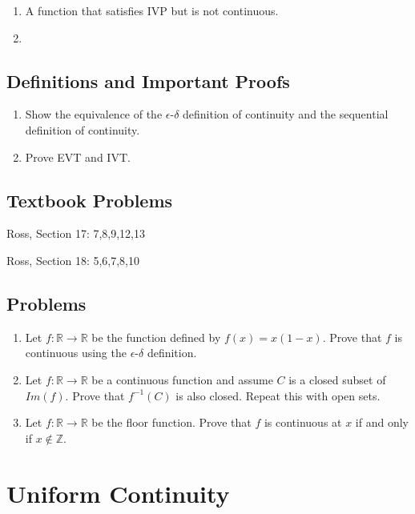 \documentclass{article}
\theoremstyle{definition}
\newcommand{\Z}{\mathbb{Z}}
\newcommand{\R}{\mathbb{R}}
\begin{document}
\begin{enumerate}
    \item A function that satisfies IVP but is not continuous.
    \item 
\end{enumerate}

\subsection{Definitions and Important Proofs}

\begin{enumerate}
    \item Show the equivalence of the $\epsilon$-$\delta$ definition of continuity and the sequential definition of continuity.
    \item Prove EVT and IVT.
\end{enumerate}

\subsection{Textbook Problems}

Ross, Section 17: 7,8,9,12,13

Ross, Section 18: 5,6,7,8,10

\subsection{Problems}

\begin{enumerate}
    \item Let $f: \R \xrightarrow{} \R$ be the function defined by $f(x) = x(1-x)$. Prove that $f$ is continuous using the $\epsilon$-$\delta$ definition.

    \item Let $f: \R \xrightarrow{} \R$ be a continuous function and assume $C$ is a closed subset of $Im(f)$. Prove that $f^{-1}(C)$ is also closed. Repeat this with open sets.
    
    \item Let $f: \R \xrightarrow{} \R$ be the floor function. Prove that $f$ is continuous at $x$ if and only if $x \notin \Z$.

\end{enumerate}

\newpage

\section{Uniform Continuity}
\end{document}

